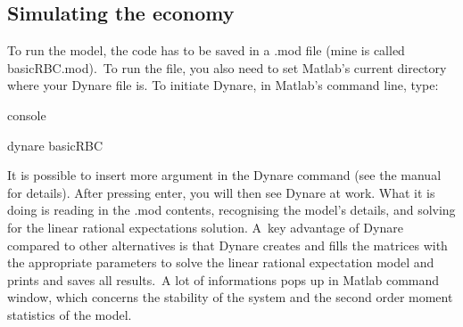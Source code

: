 \documentclass[a4paper,12pt]{article}%
\begin{document}
\subsection{Simulating the economy}

To run the model, the code has to be saved in a .mod file (mine is called
basicRBC.mod).\ To run the file, you also need to set Matlab's current
directory where your Dynare file is. To initiate Dynare, in Matlab's command
line, type:%

\vspace{3ex}
\begin{myconsole}{console}%


\textsf{dynare basicRBC}%

\end{myconsole}
\vspace{3ex}%


It is possible to insert more argument in the Dynare command (see the manual
for details). After pressing enter, you will then see Dynare at work. What it
is doing is reading in the .mod contents, recognising the model's details, and
solving for the linear rational expectations solution. A\ key advantage of
Dynare compared to other alternatives is that Dynare creates and fills the
matrices with the appropriate parameters to solve the linear rational
expectation model and prints and saves all results.\ A lot of informations
pops up in Matlab command window, which concerns the stability of the system
and the second order moment statistics of the model.%
\end{document}
